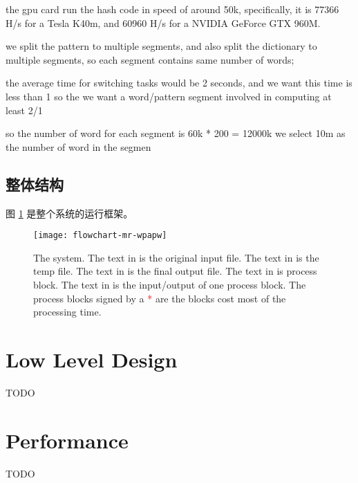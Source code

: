 the gpu card run the hash code in speed of around 50k,
specifically, it is 77366 H/s for a Tesla K40m,
and 60960 H/s for a NVIDIA GeForce GTX 960M.

we split the pattern to multiple segments,
and also split the dictionary to multiple segments,
so each segment contains same number of words;

the average time for switching tasks would be 2 seconds,
and we want this time is less than 1%
so the we want a word/pattern segment involved in computing at least 2/1%

so the number of word for each segment is 60k * 200 = 12000k
we select 10m as the number of word in the segmen



\subsection{整体结构}
图 \ref{fig:system} 是整个系统的运行框架。

\begin{figure}\centering
  \texttt{[image: flowchart-mr-wpapw]}
  \caption{The system.
    The text in  is the original input file.
    The text in  is the temp file.
    The text in  is the final output file.
    The text in  is process block.
    The text in  is the input/output of one process block.
The process blocks signed by a \textcolor[HTML]{FF0000}{*} are the blocks cost most of the processing time.
  }\label{fig:system}
\end{figure}



\section{Low Level Design}
TODO


\section{Performance}
TODO
